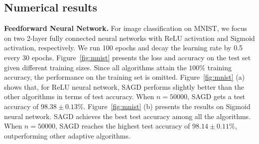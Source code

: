 \documentclass[11pt]{article}
\begin{document}
\subsection{Numerical results}\label{subsec:results}
\textbf{Feedforward Neural Network.}
For image classification on MNIST, we focus on two 2-layer fully connected neural networks with ReLU activation and Sigmoid activation, respectively. We run 100 epochs and decay the learning rate by 0.5 every 30 epochs. 
Figure~\ref{fig:mnist} presents the loss and accuracy on the test set given different training sizes. Since all algorithms attain the $100\%$ training accuracy, the performance on the training set is omitted. 
Figure~\ref{fig:mnist} (a) shows that, for ReLU neural network, 
\textsc{SAGD} performs slightly better than the other algorithms in terms of test accuracy. When $n =50000$, \textsc{SAGD} gets a test accuracy of $98.38 \pm 0.13 \%$. 
Figure~\ref{fig:mnist} (b) presents the results on Sigmoid neural network. \textsc{SAGD} achieves the best test accuracy among all the algorithms. When $n =50000$, \textsc{SAGD} reaches the highest test accuracy of $98.14 \pm 0.11 \%$, outperforming other adaptive algorithms.
\end{document}
